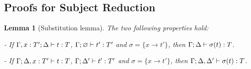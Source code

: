 \documentclass[10pt,a4paper]{article}
\newcommand{\vartyping}[2]{#1 : #2}
\newcommand{\typing}[4]{
  \ifx&#1&\varnothing \else #1\fi; 
  \ifx&#2&\varnothing \else #2\fi 
  \vdash {#3} : #4
}
\newcommand{\subarrow}{\to}
\newtheorem{lemma}[theorem]{Lemma}
\begin{document}
\subsection{Proofs for Subject Reduction}

\begin{lemma}[Substitution lemma]
  The two following properties hold:

  - If $\typing {\Gamma, \vartyping x T'} \Delta t T$, $\typing
  \Gamma \varnothing {t'} T'$ and $\sigma = \{x \subarrow t'\}$, then
  $\typing \Gamma \Delta {\sigma(t)} T$.

  - If $\typing {\Gamma} {\Delta, \vartyping x T'} t T$, $\typing
  \Gamma {\Delta'} {t'} T'$ and $\sigma = \{x \subarrow t'\}$, then
  $\typing \Gamma {\Delta, \Delta'} {\sigma(t)} T$.
\end{lemma}
\end{document}
